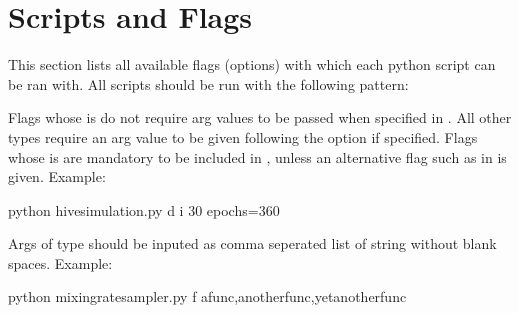 \documentclass[letterpaper,10pt,english]{sphinxmanual}
\begin{document}
\chapter{Scripts and Flags}
\label{\detokenize{scriptdocs:scripts-and-flags}}\label{\detokenize{scriptdocs::doc}}
This section lists all available flags (options) with which each python script
can be ran with. All scripts should be run with the following pattern:
\begin{quote}

\end{quote}

Flags whose  is  do not require arg values to be
passed when specified in . All other types require an arg value to be
given following the option if specified. Flags whose  is
 are mandatory to be included in , unless an alternative flag
such as  in  is given. Example:

\begin{sphinxVerbatim}[commandchars=\\\{\}]
\PYGZdl{} python hive\PYGZus{}simulation.py \PYGZhy{}d \PYGZhy{}i 30 \PYGZhy{}\PYGZhy{}epochs=360
\end{sphinxVerbatim}

Args of type  should be inputed as comma seperated list of string
without blank spaces. Example:

\begin{sphinxVerbatim}[commandchars=\\\{\}]
\PYGZdl{} python mixing\PYGZus{}rate\PYGZus{}sampler.py \PYGZhy{}f a\PYGZus{}func,another\PYGZus{}func,yet\PYGZus{}another\PYGZus{}func
\end{sphinxVerbatim}
\end{document}
